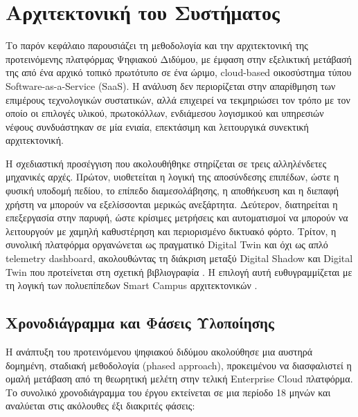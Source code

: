 ﻿\chapter{Αρχιτεκτονική του Συστήματος}
Το παρόν κεφάλαιο παρουσιάζει τη μεθοδολογία και την αρχιτεκτονική της προτεινόμενης πλατφόρμας Ψηφιακού Διδύμου, με έμφαση στην εξελικτική μετάβασή της από ένα αρχικό τοπικό πρωτότυπο σε ένα ώριμο, \textlatin{cloud-based} οικοσύστημα τύπου \textlatin{Software-as-a-Service (SaaS)}. Η ανάλυση δεν περιορίζεται στην απαρίθμηση των επιμέρους τεχνολογικών συστατικών, αλλά επιχειρεί να τεκμηριώσει τον τρόπο με τον οποίο οι επιλογές υλικού, πρωτοκόλλων, ενδιάμεσου λογισμικού και υπηρεσιών νέφους συνδυάστηκαν σε μία ενιαία, επεκτάσιμη και λειτουργικά συνεκτική αρχιτεκτονική.

Η σχεδιαστική προσέγγιση που ακολουθήθηκε στηρίζεται σε τρεις αλληλένδετες μηχανικές αρχές. Πρώτον, υιοθετείται η λογική της αποσύνδεσης επιπέδων, ώστε η φυσική υποδομή πεδίου, το επίπεδο διαμεσολάβησης, η αποθήκευση και η διεπαφή χρήστη να μπορούν να εξελίσσονται μερικώς ανεξάρτητα. Δεύτερον, διατηρείται η επεξεργασία στην παρυφή, ώστε κρίσιμες μετρήσεις και αυτοματισμοί να μπορούν να λειτουργούν με χαμηλή καθυστέρηση και περιορισμένο δικτυακό φόρτο. Τρίτον, η συνολική πλατφόρμα οργανώνεται ως πραγματικό \textlatin{Digital Twin} και όχι ως απλό \textlatin{telemetry dashboard}, ακολουθώντας τη διάκριση μεταξύ \textlatin{Digital Shadow} και \textlatin{Digital Twin} που προτείνεται στη σχετική βιβλιογραφία \cite{Kritzinger2018}. Η επιλογή αυτή ευθυγραμμίζεται με τη λογική των πολυεπίπεδων \textlatin{Smart Campus} αρχιτεκτονικών \cite{Han2022}.

\section{Χρονοδιάγραμμα και Φάσεις Υλοποίησης}
Η ανάπτυξη του προτεινόμενου ψηφιακού διδύμου ακολούθησε μια αυστηρά δομημένη, σταδιακή μεθοδολογία (\textlatin{phased approach}), προκειμένου να διασφαλιστεί η ομαλή μετάβαση από τη θεωρητική μελέτη στην τελική \textlatin{Enterprise Cloud} πλατφόρμα. Το συνολικό χρονοδιάγραμμα του έργου εκτείνεται σε μια περίοδο 18 μηνών και αναλύεται στις ακόλουθες έξι διακριτές φάσεις:


